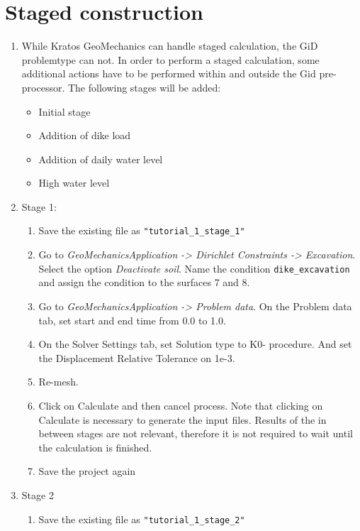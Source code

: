 \section{Staged construction}
\begin{enumerate}[resume]
	\item While Kratos GeoMechanics can handle staged calculation, the GiD problemtype can not. In order to perform a staged calculation, some additional actions have to be performed within and outside the Gid pre-processor. The following stages will be added:
	\begin{itemize}
		\item Initial stage
		\item Addition of dike load
		\item Addition of daily water level
		\item High water level
	\end{itemize}
	
	\item Stage 1:
	\begin{enumerate}
		\item Save the existing file as \verb|"tutorial_1_stage_1"|
		
		\item Go to \textit{GeoMechanicsApplication -> Dirichlet Constraints -> Excavation}. Select the option \textit{Deactivate soil}. Name the condition \verb|dike_excavation| and assign the condition to the surfaces 7 and 8. 
		
		\item Go to \textit{GeoMechanicsApplication -> Problem data}. On the Problem data tab, set start and end time from 0.0 to 1.0.
		
		\item On the Solver Settings tab, set Solution type to K0- procedure. And set the Displacement Relative Tolerance on 1e-3.
		
		\item Re-mesh. 
		
		\item Click on Calculate and then cancel process. Note that clicking on Calculate is necessary to generate the input files. Results of the in between stages are not relevant, therefore it is not required to wait until the calculation is finished.
		\item Save the project again
	\end{enumerate}

	\item Stage 2
		\begin{enumerate}
		\item Save the existing file as \verb|"tutorial_1_stage_2"|
		

\end{enumerate}
\end{enumerate}
